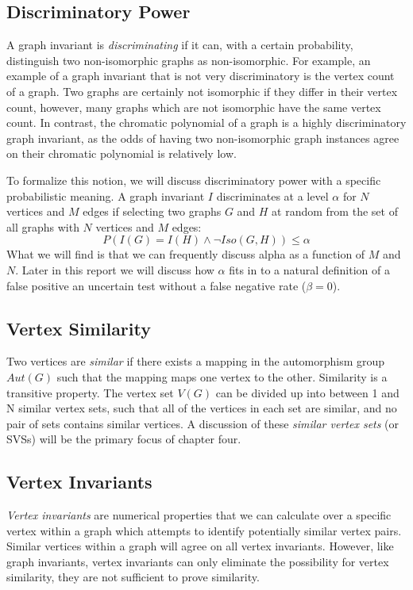 \documentclass[11pt,a4paper]{report}
\begin{document}
\subsection{Discriminatory Power}
A graph invariant is \emph{discriminating} if it can, with a certain probability, distinguish two non-isomorphic graphs as non-isomorphic.
For example, an example of a graph invariant that is not very discriminatory is the vertex count of a graph.
Two graphs are certainly not isomorphic if they differ in their vertex count, however, many graphs which are not isomorphic have the same vertex count.
In contrast, the chromatic polynomial of a graph is a highly discriminatory graph invariant, as the odds of having two non-isomorphic graph instances agree on their chromatic polynomial is relatively low.

To formalize this notion, we will discuss discriminatory power with a specific probabilistic meaning.
A graph invariant $I$ discriminates at a level $\alpha$ for $N$ vertices and $M$ edges if selecting two graphs $G$ and $H$ at random from the set of all graphs with $N$ vertices and $M$ edges:
$$P(I(G) = I(H) \wedge \neg Iso(G, H)) \leq \alpha$$
What we will find is that we can frequently discuss alpha as a function of $M$ and $N$.
Later in this report we will discuss how $\alpha$ fits in to a natural definition of a false positive an uncertain test without a false negative rate ($\beta = 0$).

\subsection{Vertex Similarity}
Two vertices are \emph{similar} if there exists a mapping in the automorphism group $Aut(G)$ such that the mapping maps one vertex to the other.
Similarity is a transitive property.
The vertex set $V(G)$ can be divided up into between 1 and N similar vertex sets, such that all of the vertices in each set are similar, and no pair of sets contains similar vertices.
A discussion of these \emph{similar vertex sets} (or SVSs) will be the primary focus of chapter four.

\subsection{Vertex Invariants}
\emph{Vertex invariants} are numerical properties that we can calculate over a specific vertex within a graph which attempts to identify potentially similar vertex pairs.
Similar vertices within a graph will agree on all vertex invariants.
However, like graph invariants, vertex invariants can only eliminate the possibility for vertex similarity, they are not sufficient to prove similarity.
\end{document}
